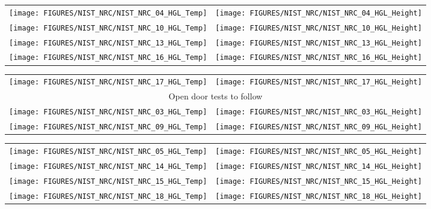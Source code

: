 \begin{figure}[p]
\begin{tabular*}{\textwidth}{l@{\extracolsep{\fill}}r}
\texttt{[image: FIGURES/NIST\_NRC/NIST\_NRC\_04\_HGL\_Temp]} &
\texttt{[image: FIGURES/NIST\_NRC/NIST\_NRC\_04\_HGL\_Height]} \\
\texttt{[image: FIGURES/NIST\_NRC/NIST\_NRC\_10\_HGL\_Temp]} &
\texttt{[image: FIGURES/NIST\_NRC/NIST\_NRC\_10\_HGL\_Height]} \\
\texttt{[image: FIGURES/NIST\_NRC/NIST\_NRC\_13\_HGL\_Temp]} &
\texttt{[image: FIGURES/NIST\_NRC/NIST\_NRC\_13\_HGL\_Height]} \\
\texttt{[image: FIGURES/NIST\_NRC/NIST\_NRC\_16\_HGL\_Temp]} &
\texttt{[image: FIGURES/NIST\_NRC/NIST\_NRC\_16\_HGL\_Height]}
\end{tabular*}
\end{figure}

\begin{figure}[p]
\begin{tabular*}{\textwidth}{l@{\extracolsep{\fill}}r}
\texttt{[image: FIGURES/NIST\_NRC/NIST\_NRC\_17\_HGL\_Temp]} &
\texttt{[image: FIGURES/NIST\_NRC/NIST\_NRC\_17\_HGL\_Height]} \\ [1.in]
\multicolumn{2}{c}{Open door tests to follow} \\ [1.in]
\texttt{[image: FIGURES/NIST\_NRC/NIST\_NRC\_03\_HGL\_Temp]} &
\texttt{[image: FIGURES/NIST\_NRC/NIST\_NRC\_03\_HGL\_Height]} \\
\texttt{[image: FIGURES/NIST\_NRC/NIST\_NRC\_09\_HGL\_Temp]} &
\texttt{[image: FIGURES/NIST\_NRC/NIST\_NRC\_09\_HGL\_Height]}
\end{tabular*}
\end{figure}

\begin{figure}[p]
\begin{tabular*}{\textwidth}{l@{\extracolsep{\fill}}r}
\texttt{[image: FIGURES/NIST\_NRC/NIST\_NRC\_05\_HGL\_Temp]} &
\texttt{[image: FIGURES/NIST\_NRC/NIST\_NRC\_05\_HGL\_Height]} \\
\texttt{[image: FIGURES/NIST\_NRC/NIST\_NRC\_14\_HGL\_Temp]} &
\texttt{[image: FIGURES/NIST\_NRC/NIST\_NRC\_14\_HGL\_Height]} \\
\texttt{[image: FIGURES/NIST\_NRC/NIST\_NRC\_15\_HGL\_Temp]} &
\texttt{[image: FIGURES/NIST\_NRC/NIST\_NRC\_15\_HGL\_Height]} \\
\texttt{[image: FIGURES/NIST\_NRC/NIST\_NRC\_18\_HGL\_Temp]} &
\texttt{[image: FIGURES/NIST\_NRC/NIST\_NRC\_18\_HGL\_Height]}
\end{tabular*}
\end{figure}


